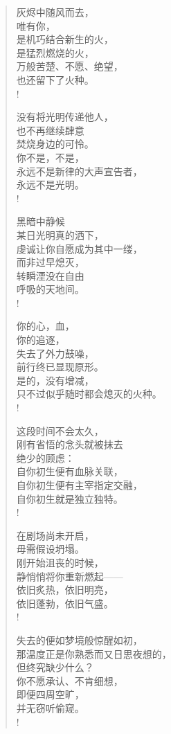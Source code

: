 \documentclass[UTF8, 12pt, a4paper]{ctexrep} %
\begin{document}
\begin{verse}
    灰烬中随风而去，\\
    唯有你，\\
    是机巧结合新生的火，\\
    是猛烈燃烧的火，\\
    万般苦楚、不愿、绝望，\\
    也还留下了火种。\\!

    没有将光明传递他人，\\
    也不再继续肆意\\
    焚烧身边的可怜。\\
    你不是，不是，\\
    永远不是新律的大声宣告者，\\
    永远不是光明。\\!

    黑暗中静候\\
    某日光明真的洒下，\\
    虔诚让你自愿成为其中一缕，\\
    而非过早熄灭，\\
    转瞬湮没在自由\\
    呼吸的天地间。\\!

    你的心，血，\\
    你的追逐，\\
    失去了外力鼓噪，\\
    前行终已显现原形。\\
    是的，没有增减，\\
    只不过似乎随时都会熄灭的火种。\\!

    这段时间不会太久，\\
    刚有省悟的念头就被抹去\\
    绝少的顾虑：\\
    自你初生便有血脉关联，\\
    自你初生便有主宰指定交融，\\
    自你初生就是独立独特。\\!

    在剧场尚未开启，\\
    毋需假设坍塌。\\
    刚开始沮丧的时候，\\
    静悄悄将你重新燃起——\\
    依旧炙热，依旧明亮，\\
    依旧蓬勃，依旧气盛。\\!

    失去的便如梦境般惊醒如初，\\
    那温度正是你熟悉而又日思夜想的，\\
    但终究缺少什么？\\
    你不愿承认、不肯细想，\\
    即便四周空旷，\\
    并无窃听偷窥。\\!


\end{verse}
\end{document}
